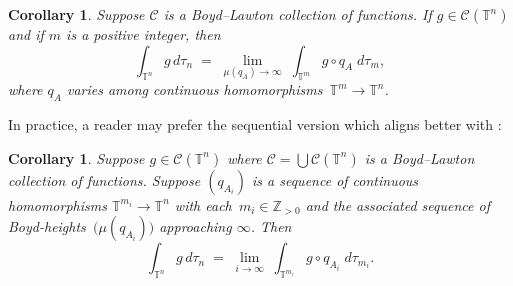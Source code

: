 \documentclass[12pt]{amsart}
\theoremstyle{plain}
\newtheorem{corollary}[theorem]{Corollary}
\theoremstyle{definition}
\theoremstyle{remark}
\numberwithin{theorem}{section}
\numberwithin{equation}{section} %
\newcommand{\ZZ}{\mathbb{Z}}
\newcommand{\mc}{\mathcal}
\newcommand{\torus}{{\mathbb{T}}}
\begin{document}
\begin{corollary}
Suppose $\mc C$ is a Boyd--Lawton collection of functions. If $g \in \mc C (\torus^n)$ and if $m$ is a positive integer,
then
$$
\int_{\torus^{n}} g \, d \tau_{n} \; = \;  \lim_{\mu\left( q_A \right)\to \infty}\;  \int_{\torus^m} g \circ q_A \; d \tau_m,
$$
where $q_A$ varies among continuous homomorphisms~$ \torus^m \to\torus^n$.
\end{corollary}

In practice, a reader may prefer the sequential version which aligns better with \cite[Theorem~1.1 and Theorem~3.1] {Brunault2024}:


\begin{corollary}
Suppose  $g \in \mc C(\torus^n)$ where
 $\mc C = \bigcup \mc C(\torus^n)$ is a Boyd--Lawton collection of functions.
 Suppose $(q_{A_i})$ is a sequence of continuous homomorphisms $\torus^{m_i} \to \torus^{n}$
 with each~$m_i\in\ZZ_{>0}$ and the associated sequence of Boyd-heights~$\big( \mu\left( q_{A_i} \right)\big) $ approaching $\infty$. Then
$$
\int_{\torus^{n}} g \, d \tau_{n} 
\; = \; 
\lim_{i\to \infty}  \; \int_{\torus^{m_i}} g \circ q_{A_i} \; d \tau_{m_i}.
$$
\end{corollary}

\bigskip
\end{document}
